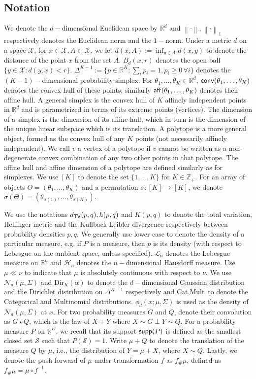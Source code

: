 \documentclass[bj,authoryear]{imsart}
\theoremstyle{plain}
\theoremstyle{remark}
\def\aff{{\sf aff}}
\def\bbR{\mathbb{R}}
\def\bbZ{\mathbb{Z}}
\def\cH{\mathcal{H}}
\def\cL{\mathcal{L}}
\def\cN{\mathcal{N}}
\def\cS{\mathcal{S}}
\def\cX{\mathcal{X}}
\def\conv{{\sf conv}}
\def\norm#1{\left\|#1\right\|}
\def\supp{{\sf supp}}
\def\TV{{\sf TV}}
\begin{document}
\subsection*{Notation}\label{sec:notation}
We denote the $d-$dimensional Euclidean space by $\bbR^d$ and $\norm{\cdot}, \norm{\cdot}_1$ respectively denotes the Euclidean norm and the $1-$norm. Under a metric $d$ on a space $\cX$, for $x\in\cX, A\subset \cX$, we let $d(x,A):=\inf_{y\in A} d(x,y)$ to denote the distance of the point $x$ from the set $A$. $B_d(x,r)$ denotes the open ball $\{y\in \cX: d(y,x)<r\}$. $\Delta^{K-1}:=\{p\in\bbR^K: \sum_i p_i = 1, p_i\geq 0 \, \forall i\}$ denotes the $(K-1)-$dimensional probability simplex. For $\theta_1,\dots,\theta_K\in\bbR^d$, $\conv(\theta_1,\dots,\theta_K)$ denotes the convex hull of these points; similarly $\aff(\theta_1,\dots,\theta_K)$ denotes their affine hull. A general simplex is the convex hull of $K$ affinely independent points in $\bbR^d$ and is parametrized in terms of its extreme points (vertices). The dimension of a simplex is the dimension of its affine hull, which in turn is the dimension of the unique linear subspace which is its translation. A polytope is a more general object, formed as the convex hull of any $K$ points (not necessarily affinely independent). We call $v$ a vertex of a polytope if $v$ cannot be written as a non-degenerate convex combination of any two other points in that polytope. The affine hull and affine dimension of a polytope are defined similarly as for simplexes. We use $[K]$ to denote the set $\{1,\dots,K\}$ for $K\in\bbZ_+$. For an array of objects $\Theta=(\theta_1,\dots,\theta_K)$ and a permutation $\sigma:[K]\to[K]$, we denote $\sigma(\Theta)=(\theta_{\sigma(1)},\dots,\theta_{\sigma(K)})$. 

We use the notations $d_{\TV}(p,q), h(p,q)$ and $K(p,q)$ to denote the total variation, Hellinger metric and the Kullback-Leibler divergence respectively between probability densities $p,q$. We generally use lower case to denote the density of a particular measure, e.g. if $P$ is a measure, then $p$ is its density (with respect to Lebesgue on the ambient space, unless specified). $\cL_n$ denotes the Lebesgue measure on $\bbR^n$ and $\cH_n$ denotes the $n-$dimensional Hausdorff measure. Use $\mu\ll\nu$ to indicate that $\mu$ is absolutely continuous with respect to $\nu$. We use $\cN_d(\mu,\Sigma)$ and $ \text{Dir}_K(\alpha)$ to denote the $d-$dimensional Gaussian distribution and the Dirichlet distribution on $\Delta^{K-1}$ respectively and $\text{Cat}, \text{Mult}$ to denote the Categorical and Multinomial distributions. $\phi_d(x;\mu,\Sigma)$ is used as the density of $\cN_d(\mu,\Sigma)$ at $x$. For two probability measures $G$ and $Q$, denote their convolution as $G\star Q$, which is the law of $X+Y$ where $X\sim G\perp Y\sim Q$. For a probability measure $P$ on $\bbR^D$, we recall that its support $\supp(P)$ is defined as the smallest closed set $\cS$ such that $P(\cS)=1$. Write $\mu+Q$ to denote the translation of the measure $Q$ by $\mu$, i.e., the distribution of $Y=\mu+X$, where $X\sim Q$. Lastly, we denote the push-forward of $\mu$ under transformation $f$ as $f_{\#}\mu$, defined as $f_{\#}\mu= \mu\circ f^{-1}$.
\end{document}
